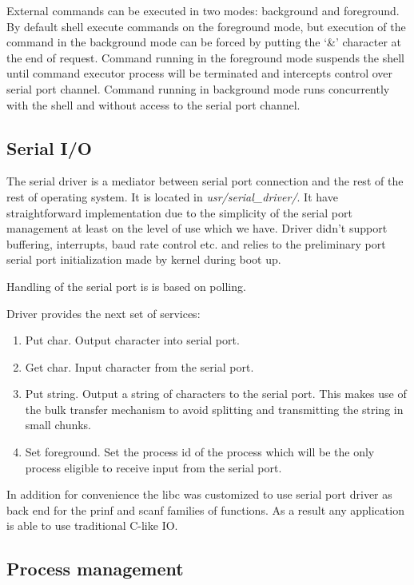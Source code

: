 \documentclass[a4paper,10pt]{article}
\newcommand{\filepath}[1]{\emph{ #1}}
\begin{document}
	External commands can be executed in two modes: background and foreground.
	By default shell execute commands on the foreground mode, but execution of the command in the background mode can be forced by putting the `\&' character at the end of request.
	Command running in the foreground mode suspends the shell until command executor process will be terminated and intercepts control over serial port channel.
	Command running in background mode runs concurrently with the shell and without access to the serial port channel.
    	    	
	 \subsection{Serial I/O}
	 	The serial driver is a mediator between serial port connection and the rest of the rest of operating system. It is located in \filepath{usr/serial\_driver/}.
	 	It have straightforward implementation due to the simplicity of the serial port management at least on the level of use which we have.
	 	Driver didn't support buffering, interrupts, baud rate control etc. and relies to the preliminary port serial port initialization made by kernel during boot up.
	 	
	 	Handling of the serial port is is based on polling.
		
		Driver provides the next set of services:
		\begin{enumerate}
			\item Put char. Output character into serial port.
			\item Get char. Input character from the serial port.
			\item Put string. Output a string of characters to the serial port. This makes use of the bulk transfer mechanism to avoid splitting and transmitting the string in small chunks.
			\item Set foreground. Set the process id of the process which will be the only process eligible to receive input from the serial port.
		\end{enumerate}
		
		In addition for convenience the libc was customized to use serial port driver as back end for the prinf and scanf families of functions.
		As a result any application is able to use traditional C-like IO.

\subsection{Process management}
\label{sec:process-management}
\end{document}
